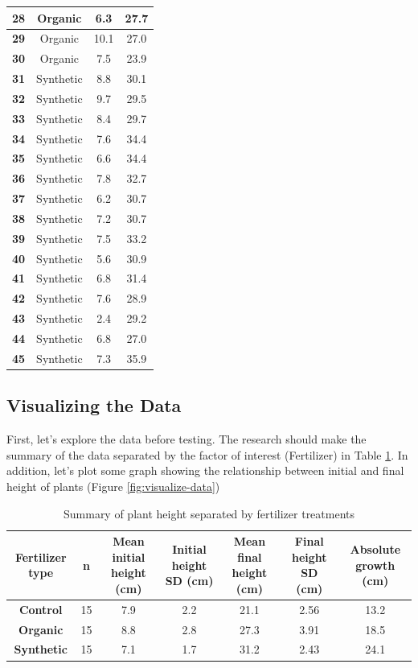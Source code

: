 \documentclass[
]{book}
\begin{document}
\begin{table}
\begin{tabular}[t]{>{}c|c|c|c}
\hline
\textbf{28} & Organic & 6.3 & 27.7\\
\hline
\textbf{29} & Organic & 10.1 & 27.0\\
\hline
\textbf{30} & Organic & 7.5 & 23.9\\
\hline
\textbf{31} & Synthetic & 8.8 & 30.1\\
\hline
\textbf{32} & Synthetic & 9.7 & 29.5\\
\hline
\textbf{33} & Synthetic & 8.4 & 29.7\\
\hline
\textbf{34} & Synthetic & 7.6 & 34.4\\
\hline
\textbf{35} & Synthetic & 6.6 & 34.4\\
\hline
\textbf{36} & Synthetic & 7.8 & 32.7\\
\hline
\textbf{37} & Synthetic & 6.2 & 30.7\\
\hline
\textbf{38} & Synthetic & 7.2 & 30.7\\
\hline
\textbf{39} & Synthetic & 7.5 & 33.2\\
\hline
\textbf{40} & Synthetic & 5.6 & 30.9\\
\hline
\textbf{41} & Synthetic & 6.8 & 31.4\\
\hline
\textbf{42} & Synthetic & 7.6 & 28.9\\
\hline
\textbf{43} & Synthetic & 2.4 & 29.2\\
\hline
\textbf{44} & Synthetic & 6.8 & 27.0\\
\hline
\textbf{45} & Synthetic & 7.3 & 35.9\\
\hline
\end{tabular}
\end{table}

\subsection{Visualizing the Data}\label{visualizing-the-data-1}

First, let's explore the data before testing. The research should make the summary of the data separated by the factor of interest (Fertilizer) in Table \ref{tab:summary-data-ancova}. In addition, let's plot some graph showing the relationship between initial and final height of plants (Figure \ref{fig:visualize-data})

\begin{table}
\centering
\caption{\label{tab:summary-data-ancova}Summary of plant height separated by fertilizer treatments}
\centering
\begin{tabular}[t]{>{}c|c|c|c|c|c|c}
\hline
Fertilizer type & n & Mean initial height (cm) & Initial height SD (cm) & Mean final height (cm) & Final height SD (cm) & Absolute growth (cm)\\
\hline
\textbf{Control} & 15 & 7.9 & 2.2 & 21.1 & 2.56 & 13.2\\
\hline
\textbf{Organic} & 15 & 8.8 & 2.8 & 27.3 & 3.91 & 18.5\\
\hline
\textbf{Synthetic} & 15 & 7.1 & 1.7 & 31.2 & 2.43 & 24.1\\
\hline
\end{tabular}
\end{table}
\end{document}
